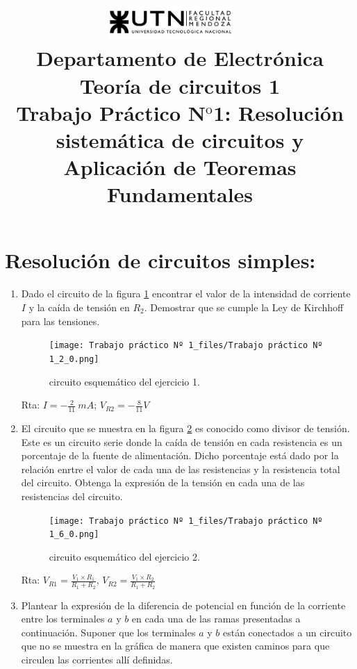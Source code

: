 \documentclass[10pt,a4paper]{article}
\title{
	\textsc{\includegraphics[width=0.35\textwidth]{logoUTN.jpg}} ~\\
	{\large Departamento de Electr\'onica}\\ 
	[0.1cm]
	{\Huge{Teoría de circuitos 1}} \\
	[0.25cm]
	{\Large{Trabajo Práctico N$^{\text {o}}$1: Resolución sistemática de circuitos y Aplicación de Teoremas Fundamentales}		\\
}}
\author{}
\date{}
\begin{document}
	\maketitle
	
\section*{Resolución de circuitos simples:}
\begin{enumerate}
	

\item {Dado el circuito de la figura \ref{e1} encontrar el valor de la intensidad de corriente $I$ y la caída de tensión en $R_2$. Demostrar que se cumple la Ley de Kirchhoff para las tensiones.}
\begin{figure}[H]
	\centering
	\texttt{[image: Trabajo práctico Nº 1\_files/Trabajo práctico Nº 1\_2\_0.png]}
	\caption{circuito esquemático del ejercicio 1.}
	\label{e1}
\end{figure}

Rta: $I=-\frac{2}{11}\ mA$; $V_{R2}=-\frac{8}{11}V$


\item El circuito que se muestra en la figura \ref{e2}  es conocido como divisor de tensión. Este es un circuito serie donde la caída de tensión en cada resistencia es un porcentaje de la fuente de alimentación. Dicho porcentaje está dado por la relación enrtre el valor de cada una de las resistencias y la resistencia total del circuito. Obtenga la expresión de la tensión en cada una de las resistencias del circuito.

\begin{figure}[H]
	\centering
	\texttt{[image: Trabajo práctico Nº 1\_files/Trabajo práctico Nº 1\_6\_0.png]}
	\caption{circuito esquemático del ejercicio 2.}
	\label{e2}
\end{figure}

    Rta: $V_{R1}=\frac{V_1 \times R_{1}}{R_1+R_2}$, $V_{R2}=\frac{V_1 \times R_{2}}{R_1+R_2}$


\item Plantear la expresión de la diferencia de potencial en función de la corriente entre los terminales $a$ y $b$ en cada una de las ramas presentadas a continuación. Suponer que los terminales $a$ y $b$ están conectados a un circuito que no se muestra en la gráfica de manera que existen caminos para que circulen las corrientes allí definidas.


\end{enumerate}
\end{document}
